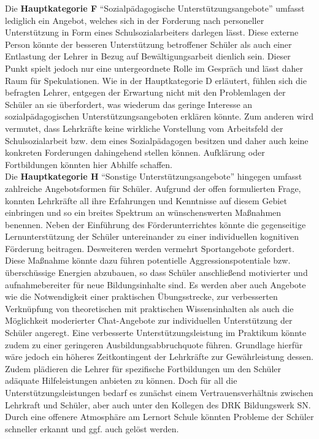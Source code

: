 \noindent
Die \textbf{Hauptkategorie F} "`Sozialpädagogische Unterstützungsangebote"' umfasst lediglich ein Angebot, welches sich in der Forderung nach personeller Unterstützung in Form eines Schulsozialarbeiters darlegen lässt. Diese externe Person könnte der besseren Unterstützung betroffener Schüler als auch einer Entlastung der Lehrer in Bezug auf Bewältigungsarbeit dienlich sein. Dieser Punkt spielt jedoch nur eine untergeordnete Rolle im Gespräch und lässt daher Raum für Spekulationen. Wie in der Hauptkategorie D erläutert, fühlen sich die befragten Lehrer, entgegen der Erwartung nicht mit den Problemlagen der Schüler an sie überfordert, was wiederum das geringe Interesse an sozialpädagogischen Unterstützungsangeboten erklären könnte. Zum anderen wird vermutet, dass Lehrkräfte keine wirkliche Vorstellung vom Arbeitsfeld der Schulsozialarbeit bzw. dem eines Sozialpädagogen besitzen und daher auch keine konkreten Forderungen dahingehend  stellen können. Aufklärung oder Fortbildungen könnten hier Abhilfe schaffen.\\

\newpage
\noindent
Die \textbf{Hauptkategorie H} "`Sonstige Unterstützungsangebote"' hingegen umfasst zahlreiche Angebotsformen für Schüler. Aufgrund der offen formulierten Frage, konnten Lehrkräfte all ihre Erfahrungen und Kenntnisse auf diesem Gebiet einbringen und so ein breites Spektrum an wünschenswerten Maßnahmen benennen. Neben der Einführung des Förderunterrichtes könnte die gegenseitige Lernunterstützung der Schüler untereinander zu einer individuellen kognitiven Förderung beitragen. Desweiteren werden vermehrt Sportangebote gefordert. Diese Maßnahme könnte dazu führen potentielle Aggressionspotentiale bzw. überschüssige Energien abzubauen, so dass Schüler anschließend motivierter und aufnahmebereiter für neue Bildungsinhalte sind. Es werden aber auch Angebote wie die Notwendigkeit einer praktischen Übungsstrecke, zur verbesserten Verknüpfung von theoretischen mit praktischen Wissensinhalten als auch die Möglichkeit moderierter Chat-Angebote zur individuellen Unterstützung der Schüler angeregt. Eine verbesserte Unterstützungsleistung im Praktikum könnte zudem zu einer geringeren Ausbildungsabbruchquote führen. Grundlage hierfür wäre jedoch ein höheres Zeitkontingent der Lehrkräfte zur Gewährleistung dessen. Zudem plädieren die Lehrer für spezifische Fortbildungen um den Schüler adäquate Hilfeleistungen anbieten zu können. Doch für all die Unterstützungsleistungen bedarf es zunächst einem Vertrauensverhältnis zwischen Lehrkraft und Schüler, aber auch unter den Kollegen des DRK Bildungswerk SN. Durch eine offenere Atmosphäre am Lernort Schule könnten Probleme der Schüler schneller erkannt und ggf. auch gelöst werden.\\

